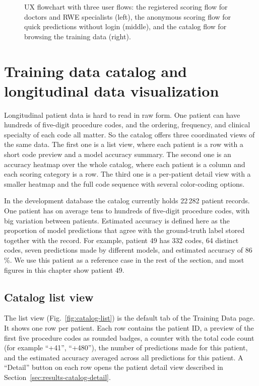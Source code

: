 \begin{figure}[h]
    \centering
    \caption{UX flowchart with three user flows: the registered scoring flow for doctors and RWE specialists (left), the anonymous scoring flow for quick predictions without login (middle), and the catalog flow for browsing the training data (right).}
    \label{fig:ux-flowchart}
\end{figure}

\section{Training data catalog and longitudinal data visualization}
\label{sec:results-catalog}

Longitudinal patient data is hard to read in raw form. One patient can have hundreds of five-digit procedure codes, and the ordering, frequency, and clinical specialty of each code all matter. So the catalog offers three coordinated views of the same data. The first one is a list view, where each patient is a row with a short code preview and a model accuracy summary. The second one is an accuracy heatmap over the whole catalog, where each patient is a column and each scoring category is a row. The third one is a per-patient detail view with a smaller heatmap and the full code sequence with several color-coding options.

In the development database the catalog currently holds 22\,282 patient records. One patient has on average tens to hundreds of five-digit procedure codes, with big variation between patients. Estimated accuracy is defined here as the proportion of model predictions that agree with the ground-truth label stored together with the record. For example, patient 49 has 332 codes, 64 distinct codes, seven predictions made by different models, and estimated accuracy of 86\,\%. We use this patient as a reference case in the rest of the section, and most figures in this chapter show patient 49.

\subsection{Catalog list view}
\label{sec:results-catalog-list}

The list view (Fig.~\ref{fig:catalog-list}) is the default tab of the Training Data page. It shows one row per patient. Each row contains the patient ID, a preview of the first five procedure codes as rounded badges, a counter with the total code count (for example ``+41'', ``+480''), the number of predictions made for this patient, and the estimated accuracy averaged across all predictions for this patient. A ``Detail'' button on each row opens the patient detail view described in Section~\ref{sec:results-catalog-detail}.

